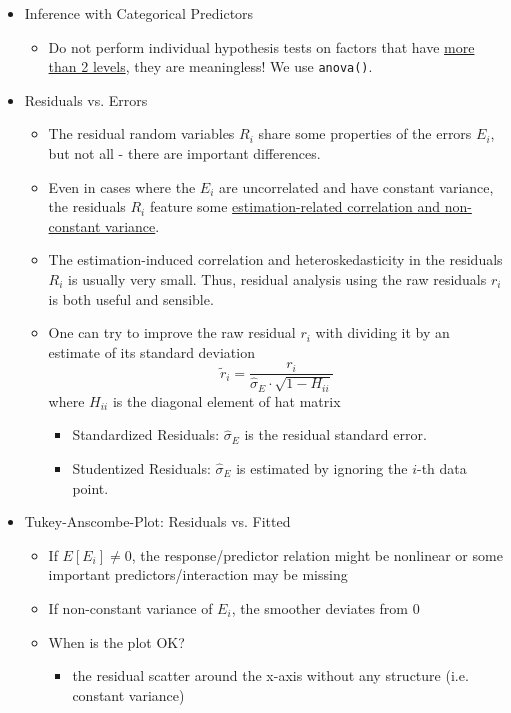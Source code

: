 \documentclass[a4paper]{article}
\begin{document}
\begin{itemize}
\begin{itemize}
    \end{itemize}
    \item Inference with Categorical Predictors
    \begin{itemize}
        \item Do not perform individual hypothesis tests on factors that have \underline{more than 2 levels}, they are meaningless! We use \texttt{anova()}.
    \end{itemize}
    \item Residuals vs. Errors
    \begin{itemize}
        \item The residual random variables $R_i$ share some properties of the errors $E_i$, but not all - there are important differences.
        \item Even in cases where the $E_i$ are uncorrelated and have constant variance, the residuals $R_i$ feature some \underline{estimation-related correlation and non-constant variance}.
        \item The estimation-induced correlation and heteroskedasticity in the residuals $R_i$ is usually very small. Thus, residual analysis using the raw residuals $r_i$ is both useful and sensible.
        \item One can try to improve the raw residual $r_i$ with dividing it by an estimate of its standard deviation
        \[\tilde{r}_i=\frac{r_i}{\hat{\sigma}_E\cdot\sqrt{1-H_{ii}}} \]
        where $H_{ii}$ is the diagonal element of hat matrix
        \begin{itemize}
            \item Standardized Residuals: $\hat{\sigma}_E$ is the residual standard error.
            \item Studentized Residuals: $\hat{\sigma}_E$ is estimated by ignoring the $i$-th data point.
        \end{itemize}
    \end{itemize}
    \item Tukey-Anscombe-Plot: Residuals vs. Fitted
    \begin{itemize}
        \item If $E[E_i]\neq0$, the response/predictor relation might be nonlinear or some important predictors/interaction may be missing
        \item If non-constant variance of $E_i$, the smoother deviates from 0
        \item When is the plot OK?
        \begin{itemize}
            \item the residual scatter around the x-axis without any structure (i.e. constant variance)

\end{itemize}
\end{itemize}
\end{itemize}
\end{document}
